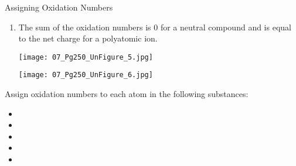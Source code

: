 \documentclass[handout]{beamer}
\begin{document}
\begin{frame}[allowframebreaks=0.9]{Assigning Oxidation Numbers}
\begin{enumerate}
			\framebreak

		\item The sum of the oxidation numbers is 0 for a neutral
			compound and is equal to the net charge for a polyatomic
			ion.
			\bigskip

			\begin{center}
				\texttt{[image: 07\_Pg250\_UnFigure\_5.jpg]}

				\bigskip

				\texttt{[image: 07\_Pg250\_UnFigure\_6.jpg]}
			\end{center}
	\end{enumerate}

	\framebreak

	Assign oxidation numbers to each atom in the following substances:

	\begin{itemize}
		\item {}
		\item {}
		\item {}
		\item {}
		\item {}
	\end{itemize}
\end{frame}
\end{document}
